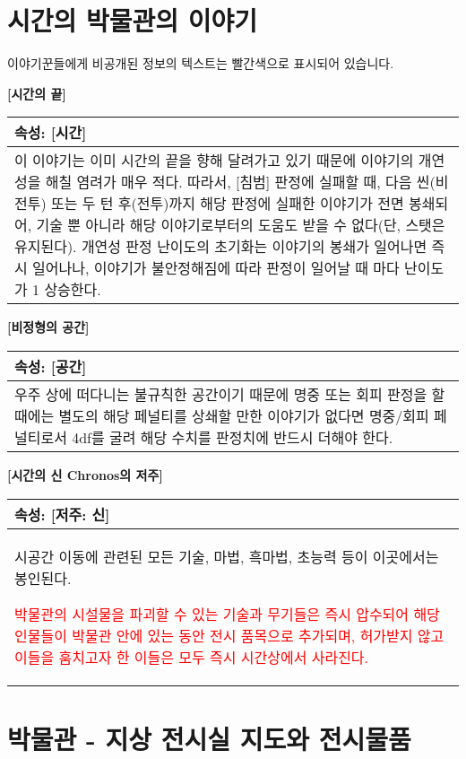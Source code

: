 \documentclass[12pt]{report}
\newenvironment{story}[2]
{\begin{center}
		{\large \textbf{[#1]}}\\[1ex]
		\begin{tabular}{|p{\textwidth}|}
			\hline
			\textbf{속성}: #2
			\\
			\hline
		}
		{
			\\\hline
		\end{tabular}
	\end{center}
}
\begin{document}
			
	
	\chapter{시간의 박물관의 이야기}
	
	이야기꾼들에게 비공개된 정보의 텍스트는 빨간색으로 표시되어 있습니다.
	
	\begin{story}{시간의 끝}{[시간]}
		이 이야기는 이미 시간의 끝을 향해 달려가고 있기 때문에 이야기의 개연성을 해칠 염려가 매우 적다. 따라서, [침범] 판정에 실패할 때, 다음 씬(비전투) 또는 두 턴 후(전투)까지 해당 판정에 실패한 이야기가 전면 봉쇄되어, 기술 뿐 아니라 해당 이야기로부터의 도움도 받을 수 없다(단, 스탯은 유지된다). 개연성 판정 난이도의 초기화는 이야기의 봉쇄가 일어나면 즉시 일어나나, 이야기가 불안정해짐에 따라 판정이 일어날 때 마다 난이도가 1 상승한다.
	\end{story}
	
	\begin{story}{비정형의 공간}{[공간]}
		우주 상에 떠다니는 불규칙한 공간이기 때문에 명중 또는 회피 판정을 할 때에는 별도의 해당 페널티를 상쇄할 만한 이야기가 없다면 명중/회피 페널티로서 4df를 굴려 해당 수치를 판정치에 반드시 더해야 한다.
	\end{story}
	
	\begin{story}{시간의 신 Chronos의 저주}{[저주: 신]}
		시공간 이동에 관련된 모든 기술, 마법, 흑마법, 초능력 등이 이곳에서는 봉인된다.
		
		\textcolor{Red}{박물관의 시설물을 파괴할 수 있는 기술과 무기들은 즉시 압수되어 해당 인물들이 박물관 안에 있는 동안 전시 품목으로 추가되며, 허가받지 않고 이들을 훔치고자 한 이들은 모두 즉시 시간상에서 사라진다.}
	\end{story}
	
	\chapter{박물관 - 지상 전시실 지도와 전시물품}
	
\end{document}
